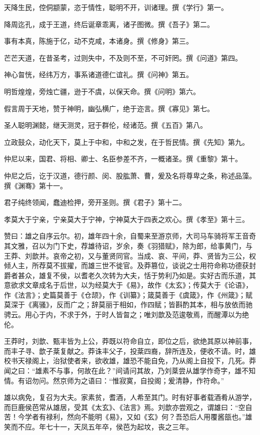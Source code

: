 \documentclass[]{article}
\begin{document}
天降生民，倥侗颛蒙，恣于情性，聪明不开，训诸理。撰《学行》第一。

降周迄孔，成于王道，终后诞章乖离，诸子图微。撰《吾子》第二。

事有本真，陈施于亿，动不克咸，本诸身。撰《修身》第三。

芒芒天道，在昔圣考，过则失中，不及则不至，不可奸罔。撰《问道》第四。

神心曶恍，经纬万方，事系诸道德仁谊礼。撰《问神》第五。

明哲煌煌，旁烛亡疆，逊于不虞，以保天命。撰《问明》第六。

假言周于天地，赞于神明，幽弘横广，绝于迩言。撰《寡见》第七。

圣人聪明渊懿，继天测灵，冠于群伦，经诸范。撰《五百》第八。

立政鼓众，动化天下，莫上于中和，中和之发，在于哲民情。撰《先知》第九。

仲尼以来，国君、将相、卿士、名臣参差不齐，一概诸圣。撰《重黎》第十。

仲尼之后，讫于汉道，德行颜、闵、股肱萧、曹，爰及名将尊卑之条，称述品藻。撰《渊骞》第十一。

君子纯终领闻，蠢迪检押，旁开圣则。撰《君子》第十二。

孝莫大于宁亲，宁亲莫大于宁神，宁神莫大于四表之欢心。撰《孝至》第十三。

赞曰：雄之自序云尔。初，雄年四十余，自蜀来至游京师，大司马车骑将军王音奇其文雅，召以为门下史，荐雄待诏，岁余，奏《羽猎赋》，除为郎，给事黄门，与王莽、刘歆并。哀帝之初，又与董贤同官。当成、哀、平间，莽、贤皆为三公，权倾人主，所荐莫不拔擢，而雄三世不徙官。及莽篡位，谈说之士用符命称功德获封爵者甚众，雄复不侯，以耆老久次转为大夫，恬于势利乃如是。实好古而乐道，其意欲求文章成名于后世，以为经莫大于《易》，故作《太玄》；传莫大于《论语》，作《法言》；史篇莫善于《仓颉》，作《训纂》；箴莫善于《虞箴》，作《州箴》；赋莫深于《离骚》，反而广之；辞莫丽于相如，作四赋；皆斟酌其本，相与放依而驰骋云。用心于内，不求于外，于时人皆曶之；唯刘歆及范逡敬焉，而醒潭以为绝伦。

王莽时，刘歆、甄丰皆为上公，莽既以符命自立，即位之后，欲绝其原以神前事，而丰子寻、歆子棻复献之。莽诛丰父子，投棻四裔，辞所连及，便收不请。时，雄校书天禄阁上，治狱使者来，欲收雄，雄恐不能自免，乃从阁上自投下，几死。莽闻之曰：``雄素不与事，何故在此？''间请问其故，乃刘棻尝从雄学作奇字，雄不知情。有诏勿问。然京师为之语曰：``惟寂寞，自投阁；爰清静，作符命。''

雄以病免，复召为大夫。家素贫，耆酒，人希至其门。时有好事者载酒肴从游学，而巨鹿侯芭常从雄居，受其《太玄》、《法言》焉。刘歆亦尝观之，谓雄曰：``空自苦！今学者有禄利，然向不能明《易》，又如《玄》何？吾恐后人用覆酱瓿也。''雄笑而不应。年七十一，天凤五年卒，侯芭为起坟，丧之三年。
\end{document}
